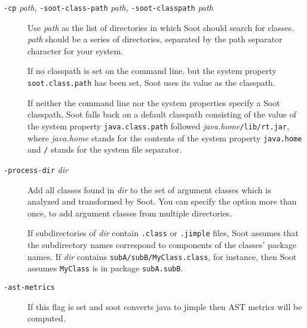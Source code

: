 \documentclass{article}
\begin{document}
\begin{description}

  \item[
  {\tt -cp}{ \it path}, 
  {\tt -soot-class-path}{ \it path}, 
  {\tt -soot-classpath}{ \it path}]


\par

Use {\it path} as the list of directories in which Soot
should search for classes. {\it path} should be a series of
directories, separated by the path separator character for your
system.

\par

If no classpath is set on the command line, but the system
property {\tt soot.class.path} has been set, Soot uses its
value as the classpath.

\par

If neither the command line nor the system properties specify a
Soot classpath, Soot falls back on a default classpath consisting
of the value of the system property {\tt java.class.path}
followed {\it java.home}{\tt /lib/rt.jar}, where
{\it java.home} stands for the contents of the system property
{\tt java.home} and {\tt /} stands for the system file
separator.



  \item[
  {\tt -process-dir}{ \it dir}]


\par

Add all classes found in {\it dir} to the set of argument classes
which is analyzed and transformed by Soot.  You can specify the
option more than once, to add argument classes from multiple directories.


\par

If subdirectories of {\it dir} contain {\tt .class} or
{\tt .jimple} files, Soot assumes that the subdirectory names
correspond to components of the classes' package names. If
{\it dir} contains {\tt subA/subB/MyClass.class}, for
instance, then Soot assumes {\tt MyClass} is in package
{\tt subA.subB}.



  \item[
  {\tt -ast-metrics}]

			If this flag is set and soot converts java to jimple then AST metrics will be computed.
	



\end{description}
\end{document}
